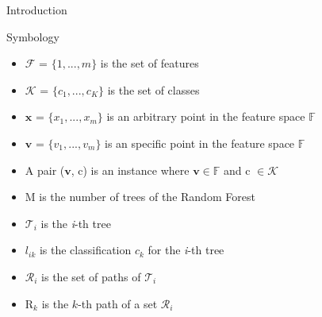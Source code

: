 \begin{frame}{Introduction}
    \begin{block}{Symbology}
        \begin{itemize}
            \item \(\mathcal{F}\) = \( \{ 1, ..., m \} \) is the set of features
            \item \(\mathcal{K}\) = \( \{ c_{1}, ..., c_{K} \} \) is the set of classes
            \item $\mathbf{x}$ = \( \{ x_{1}, ..., x_{m} \} \) is an arbitrary point in the feature space $\mathbb{F}$
            \item $\mathbf{v}$ = \( \{ v_{1}, ..., v_{m} \} \) is an specific point in the feature space $\mathbb{F}$
            \item A pair ($\mathbf{v}$, c) is an instance where $\mathbf{v} \in \mathbb{F}$ and c $\in \mathcal{K}$
            \item M is the number of trees of the Random Forest
            \item $\mathcal{T}_{i}$ is the \textit{i}-th tree
            \item $l_{ik}$ is the classification $c_{k}$ for the \textit{i}-th tree
            \item \(\mathcal{R}_{i}\) is the set of paths of \(\mathcal{T}_{i}\)
            \item R$_{k}$ is the $k$-th path of a set \(\mathcal{R}_{i}\)
        \end{itemize}
    \end{block}
\end{frame}
